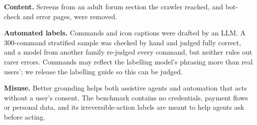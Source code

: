 \documentclass[sigconf,screen,review]{acmart}
\begin{document}
\textbf{Content.} Screens from an adult forum section the crawler reached, and bot-check and error pages, were removed.

\textbf{Automated labels.} Commands and icon captions were drafted by an LLM. A 300-command stratified sample was checked by hand and judged fully correct, and a model from another family re-judged every command, but neither rules out rarer errors. Commands may reflect the labelling model's phrasing more than real users'; we release the labelling guide so this can be judged.

\textbf{Misuse.} Better grounding helps both assistive agents and automation that acts without a user's consent. The benchmark contains no credentials, payment flows or personal data, and its irreversible-action labels are meant to help agents ask before acting.



\end{document}
